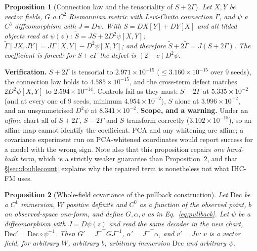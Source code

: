 \documentclass{article}
\newtheorem{proposition}{Proposition}
\newcommand{\Dec}{\mathrm{Dec}}
\begin{document}
\begin{proposition}[Connection law and the tensoriality of $S + 2\Gamma$]
\label{prop:conn}
Let $X, Y$ be vector fields, $G$ a $C^{2}$ Riemannian metric with Levi-Civita connection
$\Gamma$, and $\psi$ a $C^{3}$ diffeomorphism with $J = D\psi$. With
$S = DX[Y] + DY[X]$ and all tilded objects read at $\psi(z)$:
$\tilde S = J S + 2 D^{2}\psi[X,Y]$; $\tilde\Gamma[JX, JY] = J\Gamma[X,Y] - D^{2}\psi[X,Y]$;
and therefore $\tilde S + 2\tilde\Gamma = J(S + 2\Gamma)$. The coefficient is forced: for
$S + c\Gamma$ the defect is $(2-c)D^{2}\psi$.
\end{proposition}

\noindent\textbf{Verification.} $S + 2\Gamma$ is tensorial to $2.971\times10^{-15}$
($\le 3.160\times10^{-15}$ over $9$ seeds), the connection law holds to
$4.585\times10^{-15}$, and the cross-term defect matches $2D^{2}\psi[X,Y]$ to
$2.594\times10^{-14}$. Controls fail as they must: $S - 2\Gamma$ at $5.335\times10^{-2}$
(and at every one of $9$ seeds, minimum $4.954\times10^{-2}$), $S$ alone at
$3.996\times10^{-2}$, and an unsymmetrised $D^{2}\psi$ at $8.341\times10^{-2}$.
\textbf{Scope, and a warning.} Under an \emph{affine} chart all of $S+2\Gamma$, $S-2\Gamma$
and $S$ transform correctly ($3.102\times10^{-15}$), so an affine map cannot identify the
coefficient. PCA and any whitening are affine; a covariance experiment run on PCA-whitened
coordinates would report success for a model with the wrong sign. Note also that this
proposition repairs \emph{one hand-built term}, which is a strictly weaker guarantee than
Proposition~\ref{prop:cov}, and that \S\ref{sec:doublecount} explains why the repaired term
is nonetheless not what IHC-FM uses.

\begin{proposition}[Whole-field covariance of the pullback construction]
\label{prop:cov}
Let $\Dec$ be a $C^{1}$ immersion, $W$ positive definite and $C^{0}$ as a function of the
\emph{observed} point, $b$ an observed-space one-form, and define $G, \alpha, v$ as in
Eq.~\ref{eq:pullback}. Let $\psi$ be a diffeomorphism with $J = D\psi(z)$ and read the same
decoder in the new chart, $\Dec' = \Dec\circ\psi^{-1}$. Then
$G' = J^{-\top} G J^{-1}$, $\alpha' = J^{-\top}\alpha$, and $v' = J v$: $v$ is a vector
field, for arbitrary $W$, arbitrary $b$, arbitrary immersion $\Dec$ and arbitrary $\psi$.
\end{proposition}
\end{document}

